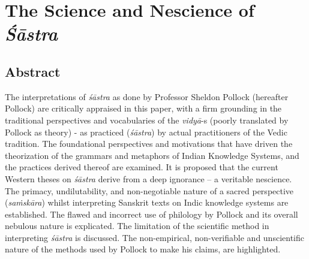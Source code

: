 \chapter{The Science and Nescience of {\sl\bfseries Śāstra}}\label{chapter\thechapter:begin}
\vskip -10pt


\vskip -10pt


\section*{Abstract}

The interpretations of {\sl śāstra} as done by Professor Sheldon Pollock (hereafter Pollock) are critically appraised in this paper, with a firm grounding in the traditional perspectives and vocabularies of the {\sl vidyā}-s (poorly translated by Pollock as theory) - as practiced ({\sl śāstra}) by actual practitioners of the Vedic tradition. The foundational perspectives and motivations that have driven the theorization of the grammars and metaphors of Indian Knowledge Systems, and the practices derived thereof are examined. It is proposed that the current Western theses on {\sl śāstra} derive from a deep ignorance -- a veritable nescience. The primacy, undilutability, and non-negotiable nature of a sacred perspective ({\sl saṁskāra}) whilst interpreting Sanskrit texts on Indic knowledge systems are established. The flawed and incorrect use of philology by Pollock and its overall nebulous nature is explicated. The limitation of the scientific method in interpreting {\sl śāstra} is discussed. The non-empirical, non-verifiable and unscientific nature of the methods used by Pollock to make his claims, are highlighted. 

